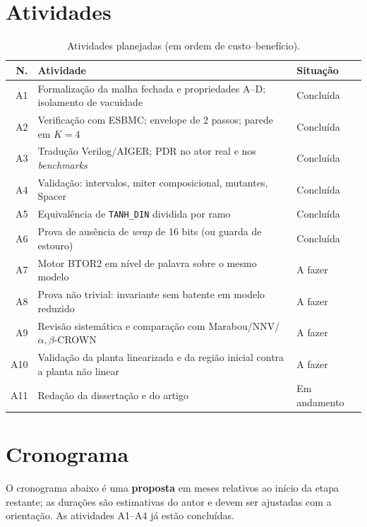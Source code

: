 \documentclass[12pt,openright,oneside,a4paper,chapter=TITLE,sumario=tradicional,english,brazil]{abntex2}
\begin{document}
\section{Atividades}

\begin{table}[htb]
\caption{Atividades planejadas (em ordem de custo--benefício).}\label{tab:ativ}
\centering
\begin{tabular}{r|p{8.2cm}|p{3.2cm}}
\toprule
\textbf{N.} & \textbf{Atividade} & \textbf{Situação} \\
\midrule
A1 & Formalização da malha fechada e propriedades A--D; isolamento de vacuidade & Concluída \\
A2 & Verificação com ESBMC; envelope de 2 passos; parede em $K{=}4$ & Concluída \\
A3 & Tradução Verilog/AIGER; PDR no ator real e nos \emph{benchmarks} & Concluída \\
A4 & Validação: intervalos, miter composicional, mutantes, Spacer & Concluída \\
A5 & Equivalência de \texttt{TANH\_DIN} dividida por ramo & Concluída \\
A6 & Prova de ausência de \emph{wrap} de 16 bits (ou guarda de estouro) & Concluída \\
A7 & Motor BTOR2 em nível de palavra sobre o mesmo modelo & A fazer \\
A8 & Prova não trivial: invariante sem batente em modelo reduzido & A fazer \\
A9 & Revisão sistemática e comparação com Marabou/NNV/$\alpha,\beta$-CROWN & A fazer \\
A10 & Validação da planta linearizada e da região inicial contra a planta não linear & A fazer \\
A11 & Redação da dissertação e do artigo & Em andamento \\
\bottomrule
\end{tabular}
\end{table}

\section{Cronograma}

O cronograma abaixo é uma \textbf{proposta} em meses relativos ao início da etapa restante; as durações são estimativas do autor e devem ser ajustadas com a orientação. As atividades A1--A4 já estão concluídas.
\end{document}
